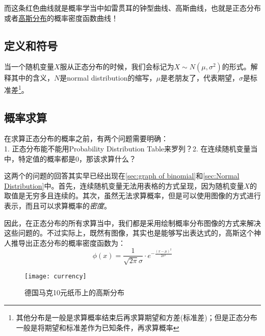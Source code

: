 而这条红色曲线就是概率学当中如雷贯耳的钟型曲线、高斯曲线，也就是正态分布或者\href{https://en.wikipedia.org/wiki/Normal_distribution}{高斯分布}的概率密度函数曲线！

\subsection*{定义和符号}
当一个随机变量$X$服从正态分布的时候，我们会标记为$X\sim N(\mu,\sigma^2)$的形式。解释其中的含义，$N$是normal distribution的缩写，$\mu$是老朋友了，代表期望，$\sigma$是标准差\footnote{其他分布是一般是求算概率结束后再求算期望和方差(标准差)；但是正态分布一般是将期望和标准差作为已知条件，再求算概率}。

\subsection*{概率求算}
在求算正态分布的概率之前，有两个问题需要明确：\\

1. 正态分布能不能用Probability Distribution Table来罗列？2. 在连续随机变量当中，特定值的概率都是0，那该求算什么？

这两个的问题的回答其实早已经出现在\ref{sec:graph of binomial}和\ref{sec:Normal Distribution}中。首先，连续随机变量无法用表格的方式呈现，因为随机变量$X$的取值是无穷多且连续的。其次，虽然无法求算概率，但是可以使用图像的方式进行表示，而且可以求算概率的\emph{密度}。

因此，在正态分布的所有求算当中，我们都是采用绘制概率分布图像的方式来解决这些问题的。不过实际上，既然有图像，其实也是能够写出表达式的，高斯这个神人推导出正态分布的概率密度函数为：
\[
	\phi (x) = \frac{1}{\sqrt{2\pi}\sigma} \cdot e^{-\frac{(x-\mu)^2}{2\sigma^2}}
\]

\begin{figure}[H]
\centering
\texttt{[image: currency]}
\caption{德国马克10元纸币上的高斯分布}
\end{figure}

